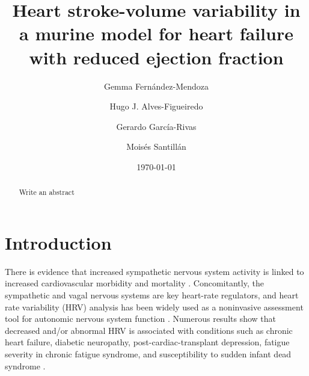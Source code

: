 \documentclass[%
preprint,
 amsmath,amssymb,
 aps,
]{revtex4-2}
\begin{document}
\preprint{}

\title{Heart stroke-volume variability in a murine model for heart failure with reduced ejection fraction}%

\author{Gemma Fernández-Mendoza}
%

\author{Hugo J. Alves-Figueiredo}
%

\author{Gerardo García-Rivas}
%

\author{Moisés Santillán}
%

\date{\today}%

\begin{abstract}
Write an abstract
\end{abstract}

\maketitle


\section{\label{sec:intro}Introduction}

There is evidence that increased sympathetic nervous system activity is linked to increased cardiovascular morbidity and mortality \citep{Malpas_2010}. Concomitantly, the sympathetic and vagal nervous systems are key heart-rate regulators, and heart rate variability (HRV) analysis has been widely used as a noninvasive assessment tool for autonomic nervous system function \citep{Kiyono_2016}. Numerous results show that decreased and/or abnormal HRV is associated with conditions such as chronic heart failure, diabetic neuropathy, post-cardiac-transplant depression, fatigue severity in chronic fatigue syndrome, and susceptibility to sudden infant dead syndrome \citep{Kamen_1995, Rajendra_Acharya_2006, Zeki_Al_Hazzouri_2014, Escorihuela_2020}. 
\end{document}
